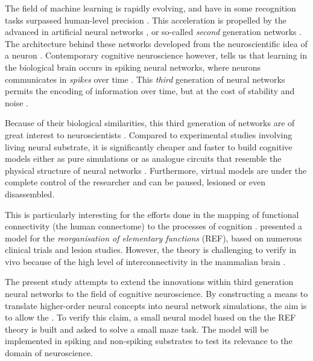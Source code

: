 \documentclass[report.tex]{subfiles}
\begin{document}
The field of machine learning is rapidly evolving, and have in
some recognition tasks surpassed human-level precision
\autocite{Schmidhuber2014}.
This acceleration is propelled by the advanced in artificial neural
networks \autocite{Rumelhart1988, Schmidhuber2014, Nilsson2009}, or
so-called \textit{second} generation networks \cite{Maass1997}.
The architecture behind these networks developed from the neuroscientific
idea of a neuron \autocite{Nilsson2009, Russel2007}.
Contemporary cognitive neuroscience however, tells us that learning in
the biological brain occurs in spiking neural networks, where neurons
communicates in \textit{spikes} over time \cite{Dayan2001, Eliasmith2004}.
This \textit{third} generation of neural networks permits the encoding
of information over time, but at the cost of stability and 
noise \autocite{Maass1997}.

Because of their biological similarities, this third generation of
networks are of great interest to neuroscientists
\autocite{Dayan2001,Bruderle2011,Eliasmith2015}.
Compared to experimental studies involving living neural substrate,
it is significantly cheaper and faster to build cognitive 
models either as pure simulations
\autocite{Davison2009, Eliasmith2015} or as analogue circuits
that resemble the physical structure of neural networks
\autocite{Walter2015, Schmitt2017}.
Furthermore, virtual models are under the complete control
of the researcher and can be paused, lesioned or even
disassembled.

This is particularly interesting for the efforts done in the
mapping of functional connectivity (the human connectome) to the
processes of cognition \autocite{Eliasmith2015, Mogensen2011}. 
\textcite{Mogensen2011} presented a model for the 
\textit{reorganisation of elementary functions} (REF), based on
numerous clinical trials and lesion studies.
However, the theory is challenging to verify in vivo because of
the high level of interconnectivity in the mammalian brain
\autocite{Hohwy2009, Mogensen2017}.

The present study attempts to extend the innovations within
third generation neural networks to the field of cognitive 
neuroscience. 
By constructing a means to translate higher-order neural
concepts into neural network simulations, the aim is to allow
the .
To verify this claim, a small neural model based on the the
\gls{REF} theory is built and asked to solve a small maze task.
The model will be implemented in spiking and non-spiking
substrates to test its relevance to the domain of neuroscience.
\end{document}

